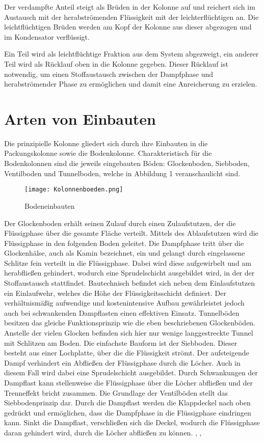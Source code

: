 \documentclass[12pt,a4paper,bibtotocnumbered,liststotocnumbered]{scrreprt}
\begin{document}
Der verdampfte Anteil steigt als Brüden in der Kolonne auf und reichert sich im Austausch mit der herabströmenden Flüssigkeit mit der leichterflüchtigen an. Die leichtflüchtigen Brüden werden am Kopf der Kolonne aus dieser abgezogen und im Kondensator verflüssigt. 

Ein Teil wird als leichtflüchtige Fraktion aus dem System abgezweigt, ein anderer Teil wird als Rücklauf oben in die Kolonne gegeben. Dieser Rücklauf ist notwendig, um einen Stoffaustausch zwischen der Dampfphase und herabströmender Phase zu ermöglichen und damit eine Anreicherung zu erzielen.


\section{Arten von Einbauten}
Die prinzipielle Kolonne gliedert sich durch ihre Einbauten in die Packungskolonne sowie die Bodenkolonne. Charakteristisch für die Bodenkolonnen sind die jeweils eingebauten Böden: Glockenboden, Siebboden, Ventilboden und Tunnelboden, welche in Abbildung 1 veranschaulicht sind.

\begin{figure}[H]
\begin{center}
\texttt{[image: Kolonnenboeden.png]}
\caption{Bodeneinbauten \cite{chemie_schule}}
\label{Abb: Methoden zur Synthese}
\end{center}
\end{figure}


Der Glockenboden erhält seinen Zulauf durch einen Zulaufstutzen, der die Flüssigphase über die gesamte Fläche verteilt. Mittels des Ablaufstutzen wird die Flüssigphase in den folgenden Boden geleitet. Die Dampfphase tritt über die Glockenhälse, auch als Kamin bezeichnet, ein und gelangt durch eingelassene Schlitze fein verteilt in die Flüssigphase. Dabei wird diese aufgewirbelt und am herabfließen gehindert, wodurch eine Sprudelschicht ausgebildet wird, in der der Stoffaustausch stattfindet. Bautechnisch befindet sich neben dem Einlaufstutzen ein Einlaufwehr, welches die Höhe der Flüssigkeitsschicht definiert. Der verhältnismäßig aufwendige und kostenintensive Aufbau gewährleistet jedoch auch bei schwankenden Dampflasten einen effektiven Einsatz. Tunnelböden besitzen das gleiche Funktionsprinzip wie die eben beschriebenen Glockenböden. Anstelle der vielen Glocken befinden sich hier nur wenige langgestreckte Tunnel mit Schlitzen am Boden. Die einfachste Bauform ist der Siebboden. Dieser besteht aus einer Lochplatte, über die die Flüssigkeit strömt. Der aufsteigende Dampf verhindert ein Abfließen der Flüssigphase durch die Löcher. Auch in diesem Fall wird dabei eine Sprudelschicht ausgebildet. Durch Schwankungen der Dampflast kann stellenweise die Flüssigphase über die Löcher abfließen und der Trenneffekt bricht zusammen. Die Grundlage der Ventilböden stellt das Siebbodenprinzip dar. Durch die Dampflast werden die Klappdeckel nach oben gedrückt und ermöglichen, dass die Dampfphase in die Flüssigphase eindringen kann. Sinkt die Dampflast, verschließen sich die Deckel, wodurch die Flüssigphase daran gehindert wird, durch die Löcher abfließen zu können. \cite{Funktion_und_Aufbau}, \cite{Brehm},\cite{Schneider2}
\end{document}
